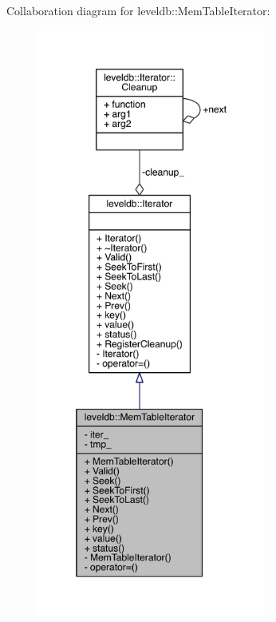 Collaboration diagram for leveldb\+:\+:Mem\+Table\+Iterator\+:\nopagebreak
\begin{figure}[H]
\begin{center}
\leavevmode
\includegraphics[height=550pt]{classleveldb_1_1_mem_table_iterator__coll__graph}
\end{center}
\end{figure}
